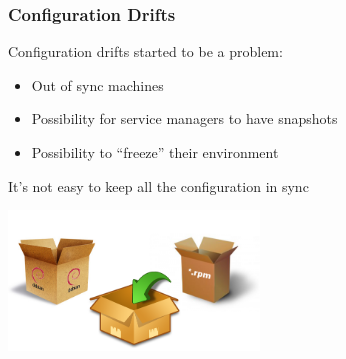 \documentclass[aspectratio=169]{beamer}
\begin{document}
\begin{frame}
    \frametitle{Configuration Drifts}
    \begin{minipage}[t]{0.95\textwidth}
        Configuration drifts started to be a problem:
        \begin{itemize}
            \item Out of sync machines
            \item Possibility for service managers to have snapshots
            \item Possibility to “freeze” their environment
       \end{itemize}
       It's not easy to keep all the configuration in sync
    \end{minipage}
    \vspace{\belowdisplayskip}
    \begin{minipage}[t]{0.95\textwidth}
        \begin{center}
            \includegraphics[width=0.5\textwidth]{package.png}
        \end{center}
    \end{minipage}
\end{frame}

\end{document}
